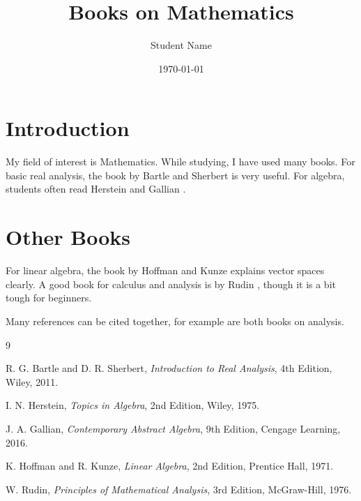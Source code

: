 \documentclass[12pt]{article}
\begin{document}
\title{Books on Mathematics}
\author{Student Name}
\date{\today}
\maketitle

\section{Introduction}
My field of interest is Mathematics. While studying, I have used many books. For basic real analysis, the book by Bartle and Sherbert \cite{bartle} is very useful. For algebra, students often read Herstein \cite{herstein} and Gallian \cite{gallian}.

\section{Other Books}
For linear algebra, the book by Hoffman and Kunze \cite{hoffman} explains vector spaces clearly. A good book for calculus and analysis is by Rudin \cite{rudin}, though it is a bit tough for beginners.

Many references can be cited together, for example \cite{bartle, rudin} are both books on analysis.

\begin{thebibliography}{9}

R. G. Bartle and D. R. Sherbert,
\textit{Introduction to Real Analysis},
4th Edition, Wiley, 2011.

I. N. Herstein,
\textit{Topics in Algebra},
2nd Edition, Wiley, 1975.

J. A. Gallian,
\textit{Contemporary Abstract Algebra},
9th Edition, Cengage Learning, 2016.

K. Hoffman and R. Kunze,
\textit{Linear Algebra},
2nd Edition, Prentice Hall, 1971.

W. Rudin,
\textit{Principles of Mathematical Analysis},
3rd Edition, McGraw-Hill, 1976.

\end{thebibliography}
\end{document}
